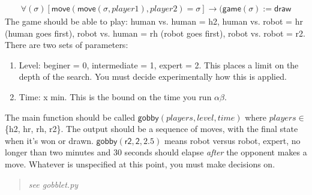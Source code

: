 \documentclass{article}
\begin{document}
\begin{enumerate}
\begin{eqnarray*}
\forall (\sigma) [\mathsf{move}(\mathsf{move}(\sigma, player1), player2) = \sigma] \rightarrow (\mathsf{game}(\sigma) := \mathsf{draw}
\end{eqnarray*}
The game should be able to play: human vs. human = h2, human vs. robot = hr (human goes first),
robot vs. human = rh (robot goes first), robot vs. robot = r2. There are two sets of parameters: 
\begin{enumerate}
\item Level: beginer = 0, intermediate = 1, expert = 2. This places a limit on the depth of the search. You must decide experimentally how this is applied.
\item Time: x min. This is the bound on the time you run $\alpha\beta$.
\end{enumerate}
The main function should be called $\mathsf{gobby}(players, level, time)$ where $players \in$ \{h2, hr, rh, r2\}. The output should be a sequence of moves, with the final state when it's won or drawn. $\mathsf{gobby(r2,2,2.5)}$ means robot versus robot, expert, no longer than two minutes and 30 seconds should elapse \textit{after} the opponent makes a move. Whatever is unspecified at this point, you must make decisions on.
\begin{quote}
\textit{see gobblet.py}
\end{quote}

\end{enumerate}
\end{document}
